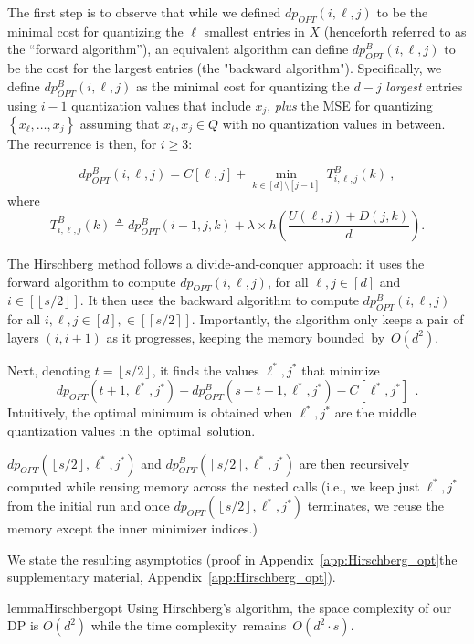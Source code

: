 \documentclass[11pt,letterpaper]{article}
\newcommand{\floor}[1]{\left\lfloor#1\right\rfloor}
\newcommand{\ceil}[1]{\left\lceil#1\right\rceil}
\newcommand{\parentheses}[1]{\left(#1\right)}
\newcommand{\set}[1]{\left\{#1\right\}}
\newcommand{\appendixlocation}[1]{\ifarxiv Appendix~\ref{#1}\else the supplementary material, Appendix~\ref{#1}\fi}
\begin{document}
{The first step is to observe that while we defined $dp_{OPT}(i,\ell,j)$ to be the minimal cost for quantizing the $\ell$ smallest entries in $X$ (henceforth referred to as the ``forward algorithm''), an equivalent algorithm can define $dp_{OPT}^B(i,\ell,j)$ to be the cost for the largest entries (the "backward algorithm").
%
%
Specifically, we define $dp_{OPT}^B(i,\ell,j)$ as the minimal cost for quantizing the $d-j$ \emph{largest} entries using $i-1$ quantization values that include $x_j$, \emph{plus} the MSE for quantizing $\set{x_\ell,\ldots,x_j}$ assuming that $x_\ell,x_j\in Q$ with no quantization values in between. 
The recurrence is then, for $i\ge 3$:

$$
dp_{OPT}^B(i,\ell,j) = 
    C[\ell,j] +  \min\limits_{k\in[d]\setminus [j-1]} \ T^B_{i,\ell,j}(k)\ ,
$$
\noindent where
{\small
\[
T^B_{i,\ell,j}(k)\triangleq dp_{OPT}^B(i-1,j,k)
+\lambda\times h\parentheses{\frac{U(\ell,j)+D(j,k)}{d}}.
\]
}

The Hirschberg method follows a divide-and-conquer approach: 
it uses the forward algorithm to compute  $dp_{OPT}(i,\ell,j)$, for all $\ell,j\in[d]$ and $i\in[\floor{s/2}]$.
It then uses the backward algorithm to compute $dp_{OPT}^B(i,\ell,j)$ for all $i,\ell,j\in[d],\in[\ceil{s/2}]$.
Importantly, the algorithm only keeps a pair of layers $(i,i+1)$ as it progresses, keeping the memory \mbox{bounded by $O(d^2)$.}

Next, denoting $t=\floor{s/2}$, it finds the values $\ell^*,j^*$ that minimize
$$
dp_{OPT}(t+1,\ell^*,j^*) + dp_{OPT}^B(s-t+1,\ell^*,j^*) - C[\ell^*,j^*] \  \ .
$$
Intuitively, the optimal minimum is obtained when $\ell^*,j^*$ are the middle quantization values in \mbox{the optimal solution.}

$dp_{OPT}(\floor{s/2},\ell^*,j^*)$ and $dp_{OPT}^B(\ceil{s/2},\ell^*,j^*)$ are then recursively computed while reusing memory across the nested calls (i.e., we keep just $\ell^*,j^*$ from the initial run and once $dp_{OPT}(\floor{s/2},\ell^*,j^*)$ terminates, we reuse the memory except the inner minimizer indices.)

We state the resulting asymptotics (proof in \appendixlocation{app:Hirschberg_opt}).

\begin{restatable}{lemma}{Hirschbergopt}\label{lem:Hirschberg_opt}
Using Hirschberg's algorithm, the space complexity of our DP is $O(d^2)$ while the time \mbox{complexity remains $O(d^2\cdot s)$.}
\end{restatable}


}
\end{document}
